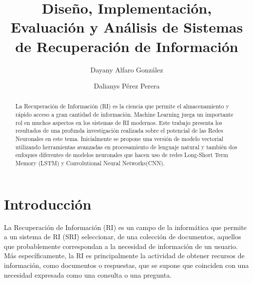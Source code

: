 \documentclass{llncs}
\begin{document}
%
%
\mainmatter              %
%
\title{ Diseño, Implementación,
	Evaluación y Análisis de Sistemas de Recuperación de Información}
%
%
\author{Dayany Alfaro González \and Dalianys Pérez Perera}
%
%
%
\institute{Universidad de La Habana, San Lázaro y L, Plaza de la Revolución, La Habana, Cuba%
}

\maketitle              %

\begin{abstract}
La Recuperación de Información (RI) es la ciencia que permite el almacenamiento y rápido acceso a gran cantidad de información. Machine Learning juega un importante rol en muchos aspectos en los sistemas de RI modernos. Este trabajo presenta los resultados de una profunda investigación realizada sobre el potencial de las Redes Neuronales en este tema. Inicialmente se propone una versión de modelo vectorial utilizando herramientas avanzadas en procesamiento de lenguaje natural y también dos enfoques diferentes de modelos neuronales que hacen uso de redes Long-Short Term Memory (LSTM) y Convolutional Neural Networks(CNN).


\end{abstract}
%
\section{Introducción}
%
La Recuperación de Información (RI) es un campo de la informática que permite a un sistema de RI (SRI) seleccionar, de una colección de documentos, aquellos que probablemente correspondan a la necesidad de información de un usuario. Más específicamente, la RI es principalmente la actividad de obtener recursos de información, como documentos o respuestas, que se supone que coinciden con una necesidad expresada como una consulta o una pregunta.
\end{document}
